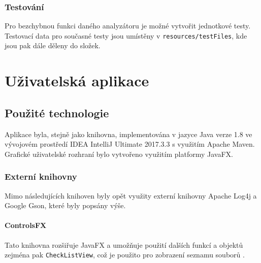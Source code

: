 	    	\subsubsection{Testování}
	    		Pro bezchybnou funkci daného analyzátoru je možné vytvořit jednotkové testy. Testovací data pro současné testy jsou umístěny v \texttt{resources/testFiles}, kde jsou pak dále děleny do složek.

    
    
    
    
	\section{Uživatelská aplikace}
	   \subsection{Použité technologie}
	    	 Aplikace byla, stejně jako knihovna, implementována v jazyce Java verze 1.8 ve vývojovém prostředí IDEA IntelliJ Ultimate 2017.3.3 s využitím Apache Maven. Grafické uživatelské rozhraní bylo vytvořeno využitím platformy JavaFX. 
	    	 
	    	 \subsubsection{Externí knihovny}
				Mimo následujících knihoven byly opět využity externí knihovny Apache Log4j a Google Gson, které byly popsány výše.
			
			\paragraph{ControlsFX} 
				Tato knihovna rozšiřuje JavaFX a umožňuje použití dalších funkcí a objektů zejména pak \texttt{CheckListView}, což je použito pro zobrazení seznamu souborů \cite{controlsfx}. 
			
